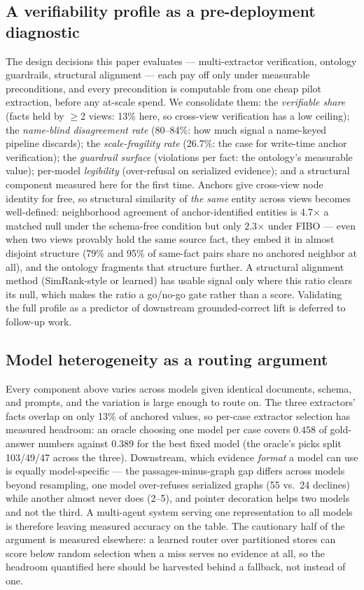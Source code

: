 \documentclass{article}
\begin{document}
\subsection{A verifiability profile as a pre-deployment diagnostic}

The design decisions this paper evaluates --- multi-extractor verification,
ontology guardrails, structural alignment --- each pay off only under
measurable preconditions, and every precondition is computable from one
cheap pilot extraction, before any at-scale spend. We consolidate them:
the \emph{verifiable share} (facts held by $\geq$2 views: 13\% here, so
cross-view verification has a low ceiling); the \emph{name-blind
disagreement rate} (80--84\%: how much signal a name-keyed pipeline
discards); the \emph{scale-fragility rate} (26.7\%: the case for
write-time anchor verification); the \emph{guardrail surface} (violations
per fact: the ontology's measurable value); per-model \emph{legibility}
(over-refusal on serialized evidence); and a structural component measured
here for the first time. Anchors give cross-view node identity for free,
so structural similarity of \emph{the same} entity across views becomes
well-defined: neighborhood agreement of anchor-identified entities is
4.7$\times$ a matched null under the schema-free condition but only
2.3$\times$ under FIBO --- even when two views provably hold the same
source fact, they embed it in almost disjoint structure (79\% and 95\% of
same-fact pairs share no anchored neighbor at all), and the ontology
fragments that structure further. A structural
alignment method (SimRank-style or learned) has usable signal only where
this ratio clears its null, which makes the ratio a go/no-go gate rather
than a score. Validating the full profile as a predictor of downstream
grounded-correct lift is deferred to follow-up work.

\subsection*{Model heterogeneity as a routing argument}

Every component above varies across models given identical documents,
schema, and prompts, and the variation is large enough to route on. The
three extractors' facts overlap on only 13\% of anchored values, so
per-case extractor selection has measured headroom: an oracle choosing one
model per case covers $0.458$ of gold-answer numbers against $0.389$ for
the best fixed model (the oracle's picks split 103/49/47 across the three).
Downstream, which evidence \emph{format} a model can use is equally
model-specific --- the passages-minus-graph gap differs across models
beyond resampling, one model over-refuses serialized graphs (55 vs.\ 24
declines) while another almost never does (2--5), and pointer decoration
helps two models and not the third. A multi-agent system serving one
representation to all models is therefore leaving measured accuracy on the
table. The cautionary half of the argument is measured elsewhere: a
learned router over partitioned stores can score below random selection
when a miss serves no evidence at all, so the headroom quantified here
should be harvested behind a fallback, not instead of one.
\end{document}
